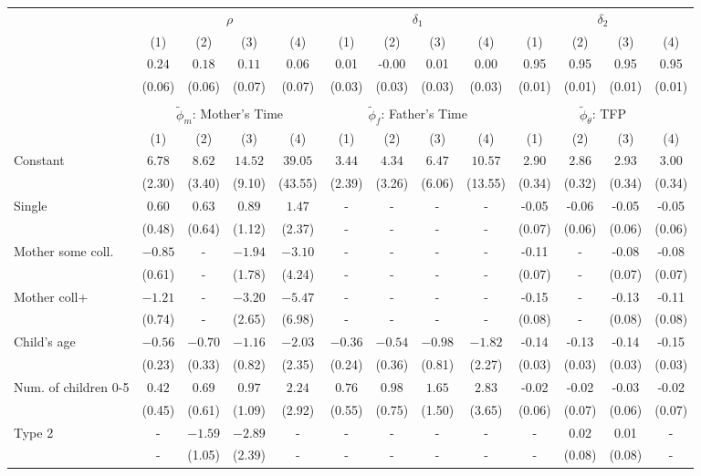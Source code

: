 \begin{tabular}{lcccccccccccc}\\\toprule
 & \multicolumn{4}{c}{$\rho$} & \multicolumn{4}{c}{$\delta_{1}$} & \multicolumn{4}{c}{$\delta_{2}$} \\
&(1)&(2)&(3)&(4)&(1)&(2)&(3)&(4)&(1)&(2)&(3)&(4)\\\cmidrule(r){2-5}\cmidrule(r){6-9}\cmidrule(r){10-13}
&$0.24$&$0.18$&$0.11$&$0.06$&0.01&-0.00&0.01&0.00&0.95&0.95&0.95&0.95\\
&(0.06)&(0.06)&(0.07)&(0.07)&(0.03)&(0.03)&(0.03)&(0.03)&(0.01)&(0.01)&(0.01)&(0.01)\\
&&&&&&&&&&&&\\
 & \multicolumn{4}{c}{$\tilde{\phi}_{m}$: Mother's Time} & \multicolumn{4}{c}{$\tilde{\phi}_{f}$: Father's Time} & \multicolumn{4}{c}{$\tilde{\phi}_{\theta}$: TFP} \\
&(1)&(2)&(3)&(4)&(1)&(2)&(3)&(4)&(1)&(2)&(3)&(4)\\\cmidrule(r){2-5}\cmidrule(r){6-9}\cmidrule(r){10-13}
Constant&$6.78$&$8.62$&$14.52$&$39.05$&$3.44$&$4.34$&$6.47$&$10.57$&2.90&2.86&2.93&3.00\\
&(2.30)&(3.40)&(9.10)&(43.55)&(2.39)&(3.26)&(6.06)&(13.55)&(0.34)&(0.32)&(0.34)&(0.34)\\
Single&$0.60$&$0.63$&$0.89$&$1.47$&-&-&-&-&-0.05&-0.06&-0.05&-0.05\\
&(0.48)&(0.64)&(1.12)&(2.37)&-&-&-&-&(0.07)&(0.06)&(0.06)&(0.06)\\
Mother some coll.&$-0.85$&-&$-1.94$&$-3.10$&-&-&-&-&-0.11&-&-0.08&-0.08\\
&(0.61)&-&(1.78)&(4.24)&-&-&-&-&(0.07)&-&(0.07)&(0.07)\\
Mother coll+&$-1.21$&-&$-3.20$&$-5.47$&-&-&-&-&-0.15&-&-0.13&-0.11\\
&(0.74)&-&(2.65)&(6.98)&-&-&-&-&(0.08)&-&(0.08)&(0.08)\\
Child's age&$-0.56$&$-0.70$&$-1.16$&$-2.03$&$-0.36$&$-0.54$&$-0.98$&$-1.82$&-0.14&-0.13&-0.14&-0.15\\
&(0.23)&(0.33)&(0.82)&(2.35)&(0.24)&(0.36)&(0.81)&(2.27)&(0.03)&(0.03)&(0.03)&(0.03)\\
Num. of children 0-5&$0.42$&$0.69$&$0.97$&$2.24$&$0.76$&$0.98$&$1.65$&$2.83$&-0.02&-0.02&-0.03&-0.02\\
&(0.45)&(0.61)&(1.09)&(2.92)&(0.55)&(0.75)&(1.50)&(3.65)&(0.06)&(0.07)&(0.06)&(0.07)\\
Type 2&-&$-1.59$&$-2.89$&-&-&-&-&-&-&0.02&0.01&-\\
&-&(1.05)&(2.39)&-&-&-&-&-&-&(0.08)&(0.08)&-\\

\end{tabular}
